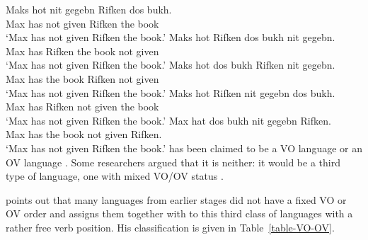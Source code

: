 \eal
\label{ex-yiddish-vo-ov}
\ex
\gll Maks hot nit gegebn Rifken dos bukh.\\
     Max  has not given  Rifken the book\\\yiddish
\glt `Max has not given Rifken the book.' 
\ex 
\gll Maks hot Rifken dos bukh nit gegebn.\\
     Max  has Rifken the book not given\\
\glt `Max has not given Rifken the book.'
\ex
\gll Maks hot dos bukh Rifken nit gegebn.\\
     Max  has the book Rifken not given\\
\glt `Max has not given Rifken the book.'
\ex
\gll Maks hot Rifken nit gegebn dos bukh.\\
     Max  has Rifken not given  the book\\
\glt `Max has not given Rifken the book.'
\ex
\glt Max hat dos bukh nit gegebn Rifken.\\
     Max has the book not given  Rifken.\\
\glt `Max has not given Rifken the book.'
\zl
{} has been claimed to be a VO language
\parencites[]{dBMvW86a}[]{Diesing97a}{Sadock98a} or an OV
language \parencites{Hall79a}{Geilfuss90a-u}[Chapter~2]{Vikner2001a}. Some researchers argued that it is
neither: it would be a third type of language, one with mixed VO/OV status \parencites{Santorini93a}[]{Schallert2007a}[]{Haider2010a}{Haider2020a}.

\citet[Section~2.5]{Schallert2007a} points out that many  languages from earlier stages did not have a
fixed VO or OV order and assigns them together with  to this third class of languages with a
rather free verb position. His classification is given in Table~\ref{table-VO-OV}.
 
\begin{table}
\caption{Constituent order typology of the Germanic languages according to \citet[]{Schallert2007a}}\label{table-VO-OV}
\end{table}

